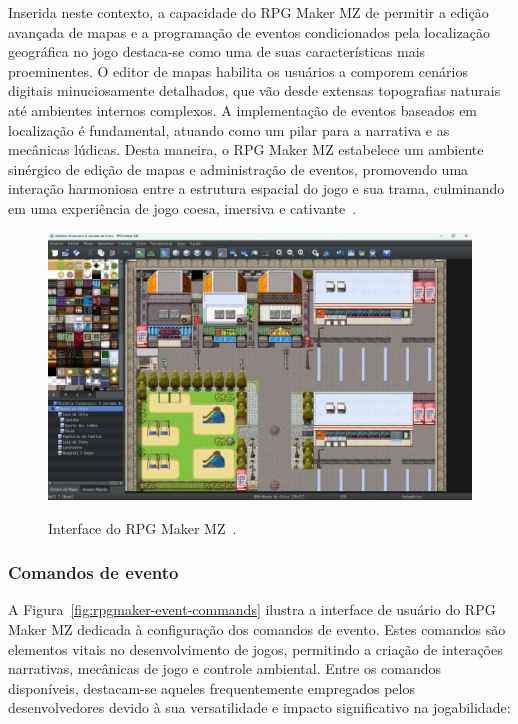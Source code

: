 Inserida neste contexto, a capacidade do RPG Maker MZ de permitir a edição avançada de mapas e a programação de eventos condicionados pela localização geográfica no jogo destaca-se como uma de suas características mais proeminentes. O editor de mapas habilita os usuários a comporem cenários digitais minuciosamente detalhados, que vão desde extensas topografias naturais até ambientes internos complexos. A implementação de eventos baseados em localização é fundamental, atuando como um pilar para a narrativa e as mecânicas lúdicas. Desta maneira, o RPG Maker MZ estabelece um ambiente sinérgico de edição de mapas e administração de eventos, promovendo uma interação harmoniosa entre a estrutura espacial do jogo e sua trama, culminando em uma experiência de jogo coesa, imersiva e cativante~\cite{RPGMakerMZ}.

\begin{figure}[ht]
	\centering
	\caption{Interface do RPG Maker MZ~\cite{RPGMakerMZ}.}
	\includegraphics[scale=0.25]{Textuais/Pictures/RPGMaker_Interface.png}
	\label{fig:rpgmaker-interface}
\end{figure}

\newpage

\subsubsection*{Comandos de evento}
A Figura~\ref{fig:rpgmaker-event-commands} ilustra a interface de usuário do RPG Maker MZ dedicada à configuração dos comandos de evento. Estes comandos são elementos vitais no desenvolvimento de jogos, permitindo a criação de interações narrativas, mecânicas de jogo e controle ambiental. Entre os comandos disponíveis, destacam-se aqueles frequentemente empregados pelos desenvolvedores devido à sua versatilidade e impacto significativo na jogabilidade:

